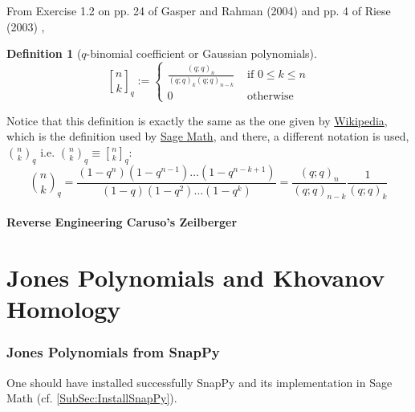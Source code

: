 \documentclass[10pt]{amsart}
\newtheorem{definition}{Definition}
\begin{document}
\begin{multicols*}{2}
From Exercise 1.2 on pp. 24 of Gasper and Rahman (2004) \cite{GGasperMRahman2004} and pp. 4 of Riese (2003) \cite{ARiese2003}, 
\begin{definition}[$q$-binomial coefficient or Gaussian polynomials]
\begin{equation}
  {n \brack k}_q := \begin{cases} \frac{ (q;q)_n }{ (q;q)_k (q;q)_{n-k} } & \text{ if } 0 \leq k \leq n \\
    0 & \text{ otherwise } \end{cases} 
\end{equation}
\end{definition} Notice that this definition is exactly the same as the one given by \href{https://en.wikipedia.org/wiki/Gaussian_binomial_coefficient}{Wikipedia}, which is the definition used by \href{http://doc.sagemath.org/html/en/reference/combinat/sage/combinat/q_analogues.html}{Sage Math}, and there, a different notation is used, $\binom{n}{k}_q$ i.e. $\binom{n}{k}_q \equiv {n \brack k}_q$:
\[
\binom{n}{k}_q = \frac{(1-q^n)(1-q^{n-1})\dots (1-q^{n-k+1}) }{ (1-q)(1-q^2 ) \dots (1-q^k) } = \frac{(q;q)_n}{(q;q)_{n-k} } \frac{1}{(q;q)_k}
\]

\subsection{Reverse Engineering Caruso's Zeilberger\cite{FCaruso1999}}


\part{Jones Polynomials and Khovanov Homology}


\section{Jones Polynomials from SnapPy}

One should have installed successfully SnapPy and its implementation in Sage Math (cf. \ref{SubSec:InstallSnapPy}).  


\end{multicols*}
\end{document}

